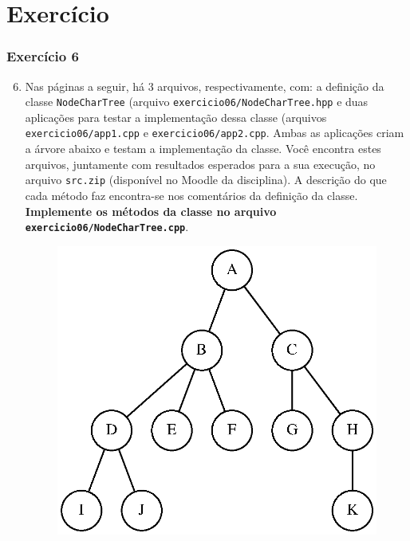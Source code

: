 \documentclass[aspectratio=169]{beamer}
\begin{document}
\section{Exercício}

\begin{frame}[fragile]\frametitle{Exercício 6}
\begin{enumerate}
        \setcounter{enumi}{5}
	\small
	\item Nas páginas a seguir, há 3 arquivos, respectivamente, com: a definição da classe \texttt{NodeCharTree} (arquivo \texttt{exercicio06/NodeCharTree.hpp} e duas aplicações para testar a implementação dessa classe (arquivos \texttt{exercicio06/app1.cpp} e \texttt{exercicio06/app2.cpp}. Ambas as aplicações criam a árvore abaixo e testam a implementação da classe. Você encontra estes arquivos, juntamente com resultados esperados para a sua execução, no arquivo \texttt{src.zip} (disponível no Moodle da disciplina). A descrição do que cada método faz encontra-se nos comentários da definição da classe. \textbf{Implemente os métodos da classe no arquivo \texttt{exercicio06/NodeCharTree.cpp}}.
\begin{figure}[h]
	\centering
	\includegraphics[height=0.4\paperheight]{imagens/arvore3.eps}
\end{figure}
\end{enumerate}
\end{frame}
\end{document}
